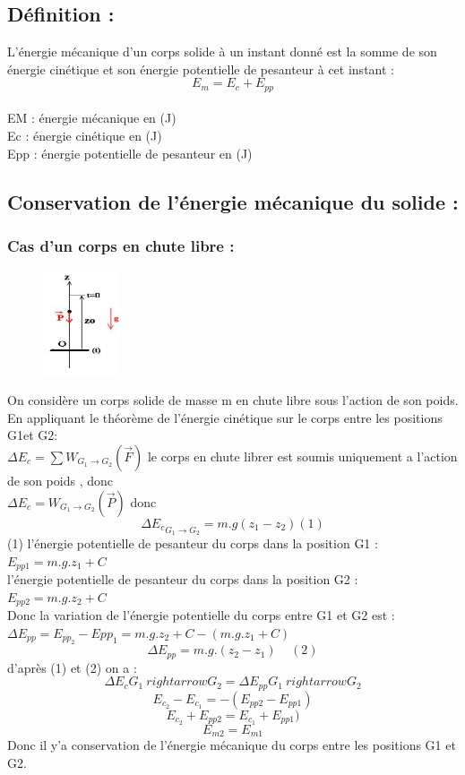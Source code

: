 \documentclass[12pt]{article}
\begin{document}
\subsection{Définition : }
L'énergie mécanique d'un corps solide à un instant donné est la somme de son énergie cinétique et son énergie potentielle de pesanteur à cet instant :
$$E_m = E_c + E_{pp}$$
\\EM : énergie mécanique en (J)
\\Ec : énergie cinétique en (J)
\\Epp : énergie potentielle de pesanteur en (J)

\subsection{Conservation de l'énergie mécanique du solide : }
\subsubsection{Cas d'un corps en chute libre : }

\begin{figure}
\includegraphics[width=0.2\textwidth]{./img/img01.jpeg}
\end{figure}


On considère un corps solide de masse m en chute libre sous l'action de son poids.
\\En appliquant le théorème de l'énergie cinétique sur le corps entre les positions G1et G2:
\\$\Delta E_{c} = \sum W_{G_1 \rightarrow G_2}(\vec{F})$
le corps en chute librer est soumis uniquement a l'action de son poids , donc  \\$\Delta E_{c} = W_{G_1 \rightarrow G_2}(\vec{P})$  donc $$\Delta {E_c}_{G_1 \rightarrow G_2} =m.g(z_1 - z_2)   (1)$$  (1) 
l'énergie potentielle de pesanteur du corps dans la position G1 : $E_{pp1} = m.g.z_1 + C$
\\l'énergie potentielle de pesanteur du corps dans la position G2 : $E_{pp2} = m.g.z_2 + C$
\\Donc la variation de l’énergie potentielle du corps entre G1 et G2 est : \\$\Delta E_{pp} = E_{pp_2} - E{pp_1} = m.g.z_2 + C - (m.g.z_1 + C)$
$$\Delta E_{pp} = m.g.(z_2 - z_1) \;\;\;\; (2)$$
d'après (1) et (2) on a :
$$\Delta {E_c}{G_1 \ rightarrow G_2} =\Delta {E_{pp}}{G_1 \ rightarrow G_2} $$
$$E_{c_2} - E_{c_1} = -(E_{pp2} - E_{pp1})$$
$$E_{c_2} + E_{pp2} = E_{c_1}  + E_{pp1})$$
$$E_{m2} = E_{m1}$$
Donc il y'a conservation de l'énergie mécanique du corps entre les positions G1 et G2.
\end{document}
